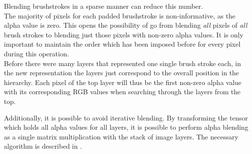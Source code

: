 Blending brushstrokes in a sparse manner can reduce this number.\\
The majority of pixels for each padded brushstroke is non-informative, as the alpha value is zero.
This opens the possibility of go from blending \textit{all} pixels of \textit{all} brush strokes to blending just those pixels with non-zero alpha values.
It is only important to maintain the order which has been imposed before for every pixel during this operation.\\
Before there were many layers that represented one single brush stroke each, in the new representation the layers just correspond to the overall position in the hierarchy.
Each pixel of the top layer will thus be the first non-zero alpha value with its corresponding RGB values when searching through the layers from the top.

Additionally, it is possible to avoid iterative blending.
By transforming the tensor which holds all alpha values for all layers, it is possible to perform alpha blending as a single matrix multiplication with the stack of image layers.
The necessary algorithm is described in .

